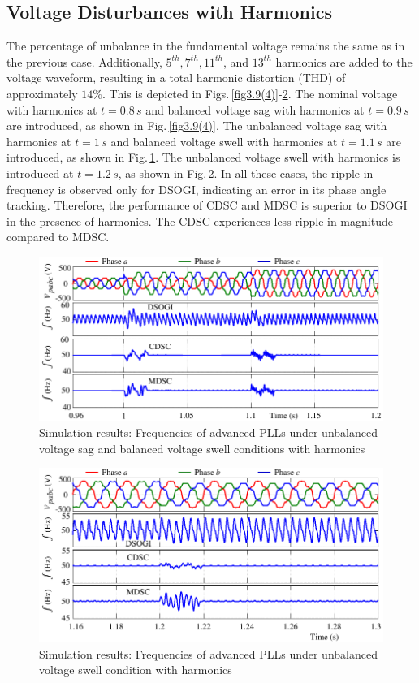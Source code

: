 \subsection{Voltage Disturbances with Harmonics}
The percentage of unbalance in the fundamental voltage remains the same as in the previous case. Additionally, $5^{th}, 7^{th}, 11^{th}$, and $13^{th}$ harmonics are added to the voltage waveform, resulting in a total harmonic distortion (THD) of approximately $14\%$. This is depicted in Figs.\,\ref{fig3.9(4)}-\ref{fig3.9(6)}. The nominal voltage with harmonics at $t=0.8\,\si{s}$ and balanced voltage sag with harmonics at $t=0.9\,\si{s}$ are introduced, as shown in Fig.\,\ref{fig3.9(4)}. The unbalanced voltage sag with harmonics at $t=1\,\si{s}$ and balanced voltage swell with harmonics at $t=1.1\,\si{s}$ are introduced, as shown in Fig.\,\ref{fig3.9(5)}. The unbalanced voltage swell with harmonics is introduced at $t=1.2\,\si{s}$, as shown in Fig.\,\ref{fig3.9(6)}. In all these cases, the ripple in frequency is observed only for DSOGI, indicating an error in its phase angle tracking. Therefore, the performance of CDSC and MDSC is superior to DSOGI in the presence of harmonics. The CDSC experiences less ripple in magnitude compared to MDSC.
\begin{figure}[] 
	\centering
	\includegraphics[scale=1]{figures/Chapter_3/Mine/SimRes5_new.pdf}
	\caption{Simulation results: Frequencies of advanced PLLs under unbalanced voltage sag and balanced voltage swell conditions with harmonics}
	\label{fig3.9(5)}
\end{figure}
\begin{figure}[] 
	\centering
	\includegraphics[scale=1]{figures/Chapter_3/Mine/SimRes6_new.pdf}
	\caption{Simulation results: Frequencies of advanced PLLs under unbalanced voltage swell condition with harmonics}
	\label{fig3.9(6)}
\end{figure}
